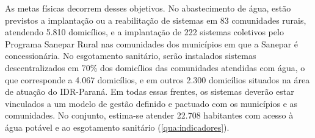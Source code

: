 As metas físicas decorrem desses objetivos. No abastecimento de água, estão
previstos a implantação ou a reabilitação de sistemas em 83 comunidades
rurais, atendendo 5.810 domicílios, e a implantação de 222 sistemas coletivos pelo Programa Sanepar Rural nas
comunidades dos municípios em que a Sanepar é concessionária. No esgotamento
sanitário, serão instalados sistemas descentralizados em 70\% dos domicílios
das comunidades atendidas com água, o que corresponde a 4.067 domicílios, e
em outros 2.300 domicílios situados na área de atuação do IDR-Paraná. Em
todas essas frentes, os sistemas deverão estar vinculados a um modelo de
gestão definido e pactuado com os municípios e as comunidades. No conjunto,
estima-se atender 22.708 habitantes com acesso à água potável e ao
esgotamento sanitário (\autoref{qua:indicadores}).

